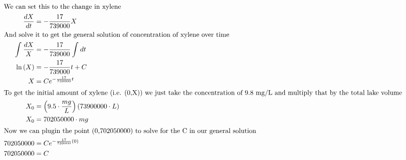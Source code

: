 \documentclass[12pt]{article}
\begin{document}
\begin{align}
  \intertext{We can set this to the change in xylene}
  \frac{dX}{dt}                                                                            & =-\frac{17}{739000}X                                                                                                                                                      \\
  \intertext{And solve it to get the general solution of concentration of xylene over time}
  \int_{ }^{ }\frac{dX}{X}                                                                 & =-\frac{17}{739000}\int_{ }^{ }dt                                                                                                                                         \\
  \ln\left(X\right)                                                                        & =-\frac{17}{739000}t+C                                                                                                                                                    \\
  X                                                                                        & =Ce^{-\frac{17}{739000}t}                                                                                                                                                 \\
  \intertext{To get the initial amount of xylene (i.e. (0,X)) we just take the concentration of 9.8 mg/L and multiply that by the total lake volume}
  X_{0}                                                                                    & =\left(9.5\cdot\frac{mg}{L}\right)\left(73900000\cdot L\right)                                                                                                            \\
  X_{0}                                                                                    & =702050000\cdot mg                                                                                                                                                        \\
  \intertext{Now we can plugin the point (0,702050000) to solve for the C in our general solution}
  702050000                                                                                & =Ce^{-\frac{17}{739000}\left(0\right)}                                                                                                                                    \\
  702050000                                                                                & =C                                                                                                                                                                        \\

\end{align}
\end{document}
